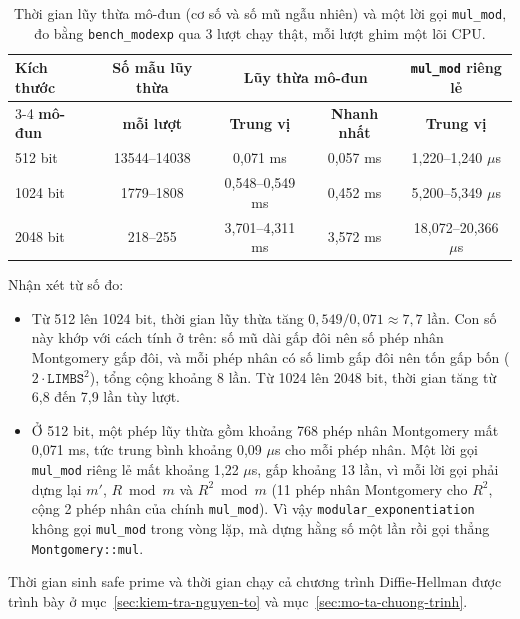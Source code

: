 \begin{table}[h!]
\centering
\small
\begin{tabular}{lcccc}
\toprule
\textbf{Kích thước} & \textbf{Số mẫu lũy thừa} & \multicolumn{2}{c}{\textbf{Lũy thừa mô-đun}} & \textbf{\texttt{mul\_mod} riêng lẻ} \\
\cmidrule(lr){3-4}
\textbf{mô-đun} & \textbf{mỗi lượt} & \textbf{Trung vị} & \textbf{Nhanh nhất} & \textbf{Trung vị} \\
\midrule
512 bit  & 13544--14038 & 0,071 ms & 0,057 ms & 1,220--1,240 $\mu$s \\
1024 bit & 1779--1808   & 0,548--0,549 ms & 0,452 ms & 5,200--5,349 $\mu$s \\
2048 bit & 218--255     & 3,701--4,311 ms & 3,572 ms & 18,072--20,366 $\mu$s \\
\bottomrule
\end{tabular}
\caption{Thời gian lũy thừa mô-đun (cơ số và số mũ ngẫu nhiên) và một lời gọi \texttt{mul\_mod}, đo bằng \texttt{bench\_modexp} qua 3 lượt chạy thật, mỗi lượt ghim một lõi CPU.}
\label{tab:bench-modexp}
\end{table}

Nhận xét từ số đo:
\begin{itemize}
    \item Từ 512 lên 1024 bit, thời gian lũy thừa tăng $0{,}549 / 0{,}071 \approx 7{,}7$ lần. Con số này khớp với cách tính ở trên: số mũ dài gấp đôi nên số phép nhân Montgomery gấp đôi, và mỗi phép nhân có số limb gấp đôi nên tốn gấp bốn ($2 \cdot \texttt{LIMBS}^2$), tổng cộng khoảng 8 lần. Từ 1024 lên 2048 bit, thời gian tăng từ 6,8 đến 7,9 lần tùy lượt.
    \item Ở 512 bit, một phép lũy thừa gồm khoảng 768 phép nhân Montgomery mất 0,071 ms, tức trung bình khoảng 0,09 $\mu$s cho mỗi phép nhân. Một lời gọi \texttt{mul\_mod} riêng lẻ mất khoảng 1,22 $\mu$s, gấp khoảng 13 lần, vì mỗi lời gọi phải dựng lại $m'$, $R \bmod m$ và $R^2 \bmod m$ (11 phép nhân Montgomery cho $R^2$, cộng 2 phép nhân của chính \texttt{mul\_mod}). Vì vậy \texttt{modular\_exponentiation} không gọi \texttt{mul\_mod} trong vòng lặp, mà dựng hằng số một lần rồi gọi thẳng \texttt{Montgomery::mul}.
\end{itemize}

Thời gian sinh safe prime và thời gian chạy cả chương trình Diffie-Hellman được trình bày ở mục~\ref{sec:kiem-tra-nguyen-to} và mục~\ref{sec:mo-ta-chuong-trinh}.
